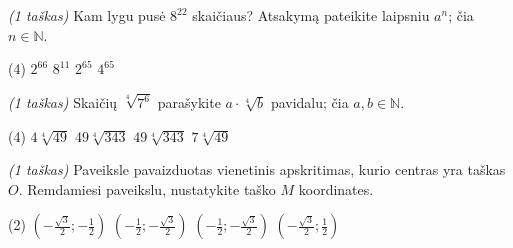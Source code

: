 \documentclass[a4paper]{article}
\begin{document}
\begin{enumerate}
      \item \textit{(1 taškas)} Kam lygu pusė $8^{22}$ skaičiaus? Atsakymą
            pateikite laipsniu $a^n$; čia $n \in \mathbb{N}$.
            \begin{tasks}[item-format={\normalfont}, after-item-skip=2mm,
                        label=\Alph*, label-format={\bfseries}](4)
                  \task $2^{66}$
                  \task $8^{11}$
                  \task $2^{65}$
                  \task $4^{65}$
            \end{tasks}
      \item \textit{(1 taškas)} Skaičių $\sqrt[4]{7^6}$ parašykite
            $a\cdot\sqrt[4]{b}$ pavidalu; čia $a, b \in \mathbb{N}$.
            \begin{tasks}[item-format={\normalfont}, after-item-skip=2mm,
                        label=\Alph*, label-format={\bfseries}](4)
                  \task $4\sqrt[4]{49}$
                  \task $49\sqrt[4]{343}$
                  \task $49\sqrt[4]{343}$
                  \task $7\sqrt[4]{49}$
            \end{tasks}

            \begin{minipage}[t]{0.725\linewidth}
                  \item \textit{(1 taškas)} Paveiksle pavaizduotas vienetinis
                  apskritimas, kurio centras yra taškas $O$. Remdamiesi
                  paveikslu, nustatykite
                  taško $M$ koordinates.
                  \vspace{2mm}
                  \begin{tasks}[item-format={\normalfont},
                              after-item-skip=3mm,
                              label=\Alph*), label-format={\bfseries},
                              column-sep=10pt](2)
                        \task $(-\frac{\sqrt{3}}{2};-\frac{1}{2})$
                        \task $(-\frac{1}{2};-\frac{\sqrt{3}}{2})$
                        \task $(-\frac{1}{2};-\frac{\sqrt{3}}{2})$
                        \task $(-\frac{\sqrt{3}}{2};\frac{1}{2})$
                  \end{tasks}

            \end{minipage}
            \begin{minipage}[t]{0.25\linewidth}
\end{minipage}
\end{enumerate}
\end{document}

